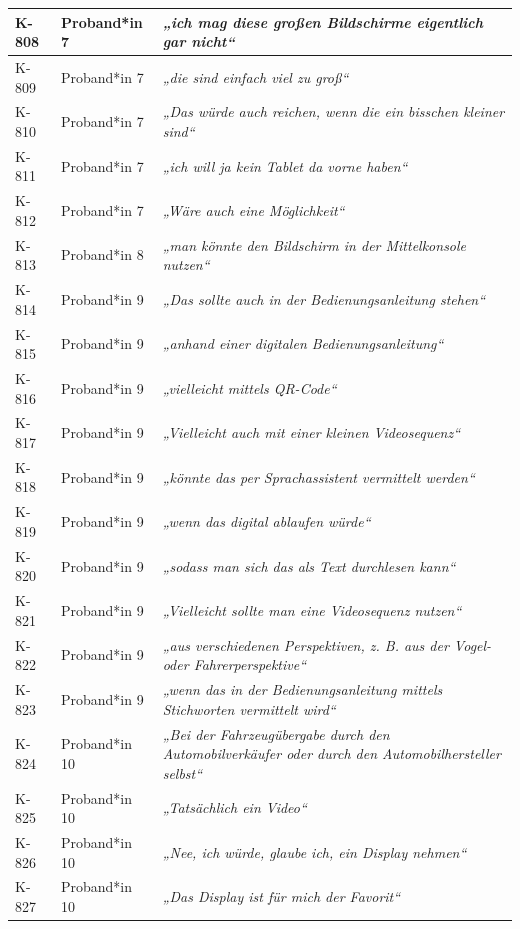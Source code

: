{\begin{xltabular}{\textwidth}{
    |P{0.10\textwidth}
    |P{0.17\textwidth}
    |Y|
}
\hline
K-808 & Proband*in 7 & \textit{„ich mag diese großen Bildschirme eigentlich gar nicht“} \\
\hline
K-809 & Proband*in 7 & \textit{„die sind einfach viel zu groß“} \\
\hline
K-810 & Proband*in 7 & \textit{„Das würde auch reichen, wenn die ein bisschen kleiner sind“} \\
\hline
K-811 & Proband*in 7 & \textit{„ich will ja kein Tablet da vorne haben“} \\
\hline
K-812 & Proband*in 7 & \textit{„Wäre auch eine Möglichkeit“} \\
\hline
K-813 & Proband*in 8 & \textit{„man könnte den Bildschirm in der Mittelkonsole nutzen“} \\
\hline
K-814 & Proband*in 9 & \textit{„Das sollte auch in der Bedienungsanleitung stehen“} \\
\hline
K-815 & Proband*in 9 & \textit{„anhand einer digitalen Bedienungsanleitung“} \\
\hline
K-816 & Proband*in 9 & \textit{„vielleicht mittels QR-Code“} \\
\hline
K-817 & Proband*in 9 & \textit{„Vielleicht auch mit einer kleinen Videosequenz“} \\
\hline
K-818 & Proband*in 9 & \textit{„könnte das per Sprachassistent vermittelt werden“} \\
\hline
K-819 & Proband*in 9 & \textit{„wenn das digital ablaufen würde“} \\
\hline
K-820 & Proband*in 9 & \textit{„sodass man sich das als Text durchlesen kann“} \\
\hline
K-821 & Proband*in 9 & \textit{„Vielleicht sollte man eine Videosequenz nutzen“} \\
\hline
K-822 & Proband*in 9 & \textit{„aus verschiedenen Perspektiven, z. B. aus der Vogel- oder Fahrerperspektive“} \\
\hline
K-823 & Proband*in 9 & \textit{„wenn das in der Bedienungsanleitung mittels Stichworten vermittelt wird“} \\
\hline
K-824 & Proband*in 10 & \textit{„Bei der Fahrzeugübergabe durch den Automobilverkäufer oder durch den Automobilhersteller selbst“} \\
\hline
K-825 & Proband*in 10 & \textit{„Tatsächlich ein Video“} \\
\hline
K-826 & Proband*in 10 & \textit{„Nee, ich würde, glaube ich, ein Display nehmen“} \\
\hline
K-827 & Proband*in 10 & \textit{„Das Display ist für mich der Favorit“} \\

\end{xltabular}}

